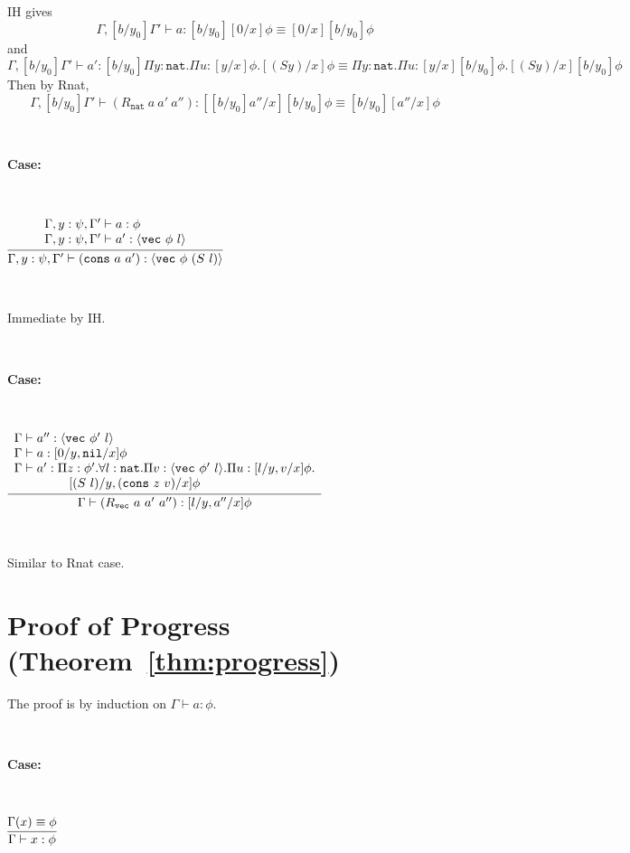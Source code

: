 \documentclass[copyright]{eptcs}
\newcommand{\vc}[0]{\texttt{vec}}
\newcommand{\nat}[0]{\texttt{nat}}
\newcommand{\nil}[0]{\texttt{nil}}
\newcommand{\cons}[0]{\texttt{cons}}
\begin{document}
IH gives \[ \Gamma,[b/y_0]\Gamma'\vdash a : [b/y_0][0/x]\phi \equiv [0/x][b/y_0]\phi \] and \[ \Gamma,[b/y_0]\Gamma'\vdash a' : [b/y_0] \Pi y:\nat. \Pi u : [y/x]\phi. [(S y)/x]\phi \equiv  \Pi y:\nat. \Pi u : [y/x][b/y_0]\phi. [(S y)/x][b/y_0]\phi
\] Then by Rnat, \[
  \Gamma,[b/y_0]\Gamma'\vdash (R_\nat\ a\ a'\ a''):[[b/y_0]a''/x][b/y_0]\phi \equiv [b/y_0][a''/x]\phi
\]

\ 

\noindent \textbf{Case:}

\

$\infer{\Gamma,y:\psi,\Gamma'\vdash (\cons\ a\ a'):\langle \vc\ \phi\ (S\ l)\rangle}
      {\begin{array}{l}\Gamma,y:\psi,\Gamma'\vdash a:\phi \\ \Gamma,y:\psi,\Gamma' \vdash a':\langle \vc\ \phi\ l\rangle
       \end{array}}$

\ 

\noindent Immediate by IH.

\ 

\noindent \textbf{Case:}

\

$\infer{\Gamma\vdash (R_\vc\ a\ a'\ a''):[l/y, a''/x]\phi}
      {\begin{array}{l}\Gamma \vdash a'' : \langle \vc\ \phi'\ l\rangle \\
       \Gamma \vdash a : [0/y,\nil/x]\phi \\
       \Gamma \vdash a' : \Pi z:\phi'. \forall l:\nat. \Pi v :\langle \vc\ \phi'\ l\rangle. \Pi u : [l/y, v/x]\phi. \\
        \ \ \ \ \ \ \ \ \ \ \ \ \  [(S\ l)/y, (\cons\ z\ v)/x]\phi
       \end{array}}$

\ 

\noindent Similar to Rnat case.



\section{Proof of Progress (Theorem~\ref{thm:progress})}
\label{sec:progress}

The proof is by induction on $\Gamma \vdash a : \phi$. 


\ 

\noindent \textbf{Case:}

\

$\infer{\Gamma\vdash x:\phi}{\Gamma(x) \equiv \phi}$
\end{document}
